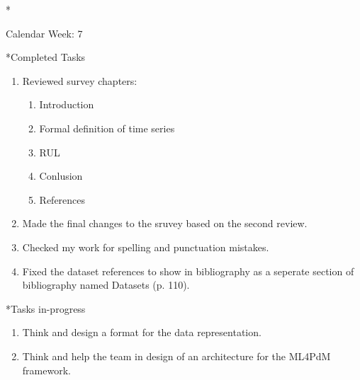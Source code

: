 \documentclass[11pt,a4paper]{article}
\begin{document}
\newpage
\begin{section}*{Calendar Week: 7  \hfill \date{19 February, 2021}}
 \begin{refsection}

       \begin{subsection}*{Completed Tasks}
             \begin{enumerate}
                   \item Reviewed survey chapters:
                         \begin{enumerate}
                               \item Introduction
                               \item Formal definition of time series
                               \item RUL
                               \item Conlusion
                               \item References
                         \end{enumerate}
                   \item
                         Made the final changes to the sruvey based on the second
                         review.
                   \item Checked my work for spelling and punctuation mistakes.
                   \item Fixed the dataset references to show in bibliography
                         as a seperate section of bibliography named Datasets (p. 110).
             \end{enumerate}
       \end{subsection}

       \begin{subsection}*{Tasks in-progress}
             \begin{enumerate}
                   \item Think and design a format for the data representation.
                   \item Think and help the team in design of an architecture for the ML4PdM framework.
             \end{enumerate}
       \end{subsection}

 \end{refsection}
\end{section}
\end{document}
